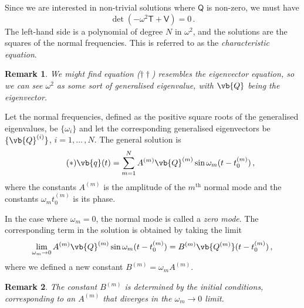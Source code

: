 \documentclass{article}
\theoremstyle{plain}\theoremheaderfont{\normalfont\itshape}\theorembodyfont{\rmfamily}\theoremseparator{.}\newtheorem*{rem}{Remark}\newtheorem*{ex}{Example}\newtheorem*{proof}{Proof}\newtheorem*{altp}{Alternative proof}
\theoremstyle{plain}\theoremheaderfont{\normalfont\bfseries}\theorembodyfont{\rmfamily}\theoremseparator{.}\newtheorem{thm}{Theorem}[section]\newtheorem{lem}[thm]{Lemma}\newtheorem{prop}[thm]{Proposition}\newtheorem*{cor}{Corollary}\newtheorem{defn}[thm]{Definition}\newtheorem{clm}[thm]{Claim}\newtheorem{clminproof}{Claim}
\theoremstyle{break}\theoremheaderfont{\normalfont\itshape}\theorembodyfont{\rmfamily}\theoremseparator{.\medskip}\newtheorem*{proofskip}{Proof}\newtheorem*{exs}{Examples}\newtheorem*{rems}{Remarks}
\theoremstyle{break}\theoremheaderfont{\normalfont\bfseries}\theorembodyfont{\rmfamily}\theoremseparator{.\medskip}\newtheorem{lemskip}[thm]{Lemma}\newtheorem{defnskip}[thm]{Definition}\newtheorem{propskip}[thm]{Proposition}\newtheorem{thmskip}[thm]{Theorem}
\numberwithin{equation}{section}
\begin{document}
	Since we are interested in non-trivial solutions where \(\mathsf{Q}\) is non-zero, we must have
	\[\det(-\omega^2\mathsf{T}+\mathsf{V})=0\,.\]
	The left-hand side is a polynomial of degree \(N\) in \(\omega^2\), and the solutions are the squares of the normal frequencies. This is referred to as the \textit{characteristic equation}.

	\begin{rem}
		We might find equation (\(\dagger\dagger\)) resembles the eigenvector equation, so we can see \(\omega^2\) as some sort of generalised eigenvalue, with \(\vb{Q}\) being the eigenvector.
	\end{rem}
	
	Let the normal frequencies, defined as the positive square roots of the generalised eigenvalues, be \(\{\omega_i\}\) and let the corresponding generalised eigenvectors be \(\{\vb{Q}^{(i)}\}\), \(i=1,\dots\,,N\). The general solution is
	\begin{equation}\tag{\(*\)}
		\vb{q}(t)=\sum_{m=1}^{N}A^{(m)}\vb{Q}^{(m)}\sin\omega_m(t-t_0^{(m)})\,,
	\end{equation}
	where the constants \(A^{(m)}\) is the amplitude of the \(m^{\text{th}}\) normal mode and the constants \(\omega_mt_0^{(m)}\) is its phase.

	In the case where \(\omega_m=0\), the normal mode is called a \textit{zero mode}. The corresponding term in the solution is obtained by taking the limit
	\[\lim_{\omega_m\to 0}A^{(m)}\vb{Q}^{(m)}\sin\omega_m(t-t_0^{(m)})=B^{(m)}\vb{Q^{(m)}}(t-t_0^{(m)})\,,\]
	where we defined a new constant \(B^{(m)}=\omega_m A^{(m)}\).
	\begin{rem}
		The constant \(B^{(m)}\) is determined by the initial conditions, corresponding to an \(A^{(m)}\) that diverges in the \(\omega_m\to 0\) limit.
	\end{rem}
\end{document}

